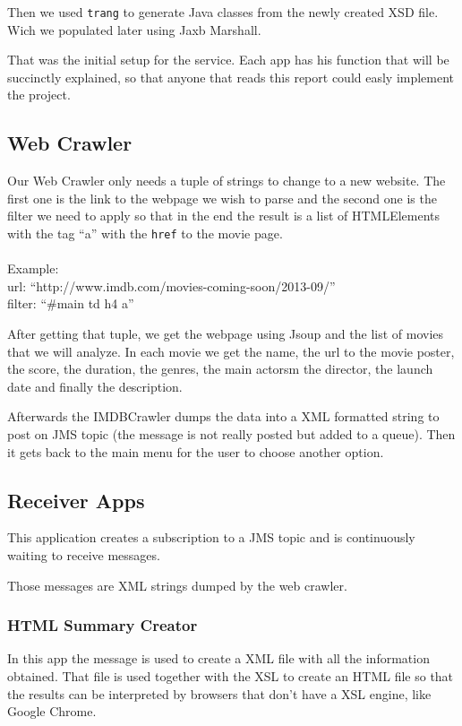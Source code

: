 \documentclass[a4paper]{article}
\begin{document}
Then we used \texttt{trang} to generate Java classes from the newly created XSD file. Wich we populated later using Jaxb Marshall.

That was the initial setup for the service. Each app has his function that will be succinctly explained, so that anyone that reads this report could easly implement the project.

\subsection{Web Crawler}
\indent \indent Our Web Crawler only needs a tuple of strings to change to a new website. The first one is the link to the webpage we wish to parse and the second one is the filter we need to apply so that in the end the result is a list of HTMLElements with the tag ``a'' with the \texttt{href} to the movie page.\\
\\Example:\\url: ``http://www.imdb.com/movies-coming-soon/2013-09/''\\filter: ``\#main td h4 a''

After getting that tuple, we get the webpage using Jsoup and the list of movies that we will analyze. In each movie we get the name, the url to the movie poster, the score, the duration, the genres, the main actorsm the director, the launch date and finally the description.

Afterwards the IMDBCrawler dumps the data into a XML formatted string to post on JMS topic (the message is not really posted but added to a queue). Then it gets back to the main menu for the user to choose another option.

\clearpage
\subsection{Receiver Apps}
\indent \indent This application creates a subscription to a JMS topic and is continuously waiting to receive messages.

Those messages are XML strings dumped by the web crawler.
\subsubsection{HTML Summary Creator}
\indent \indent In this app the message is used to create a XML file with all the information obtained. That file is used together with the XSL to create an HTML file so that the results can be interpreted by browsers that don't have a XSL engine, like Google Chrome.
\end{document}

